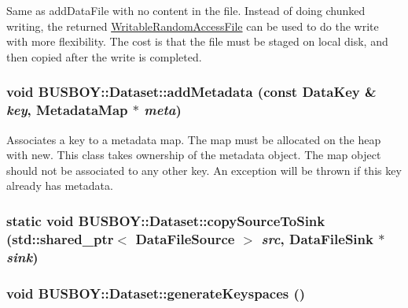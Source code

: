 Same as addDataFile with no content in the file. Instead of doing chunked writing, the returned \hyperlink{classBUSBOY_1_1WritableRandomAccessFile}{WritableRandomAccessFile} can be used to do the write with more flexibility. The cost is that the file must be staged on local disk, and then copied after the write is completed. \hypertarget{classBUSBOY_1_1Dataset_a793a73fb6cb9090b76d8a9da487a2841}{
\subsubsection[{addMetadata}]{\setlength{\rightskip}{0pt plus 5cm}void BUSBOY::Dataset::addMetadata (const {\bf DataKey} \& {\em key}, \/  {\bf MetadataMap} $\ast$ {\em meta})}}
\label{classBUSBOY_1_1Dataset_a793a73fb6cb9090b76d8a9da487a2841}


Associates a key to a metadata map. The map must be allocated on the heap with new. This class takes ownership of the metadata object. The map object should not be associated to any other key. An exception will be thrown if this key already has metadata. \hypertarget{classBUSBOY_1_1Dataset_a91fcb7b7efa36f081b74f8aa44b82197}{
\subsubsection[{copySourceToSink}]{\setlength{\rightskip}{0pt plus 5cm}static void BUSBOY::Dataset::copySourceToSink (std::shared\_\-ptr$<$ {\bf DataFileSource} $>$ {\em src}, \/  {\bf DataFileSink} $\ast$ {\em sink})}}
\label{classBUSBOY_1_1Dataset_a91fcb7b7efa36f081b74f8aa44b82197}
\hypertarget{classBUSBOY_1_1Dataset_a11aa6d3dbb6e95107d6625aaeac99035}{
\subsubsection[{generateKeyspaces}]{\setlength{\rightskip}{0pt plus 5cm}void BUSBOY::Dataset::generateKeyspaces ()}}
\label{classBUSBOY_1_1Dataset_a11aa6d3dbb6e95107d6625aaeac99035}


